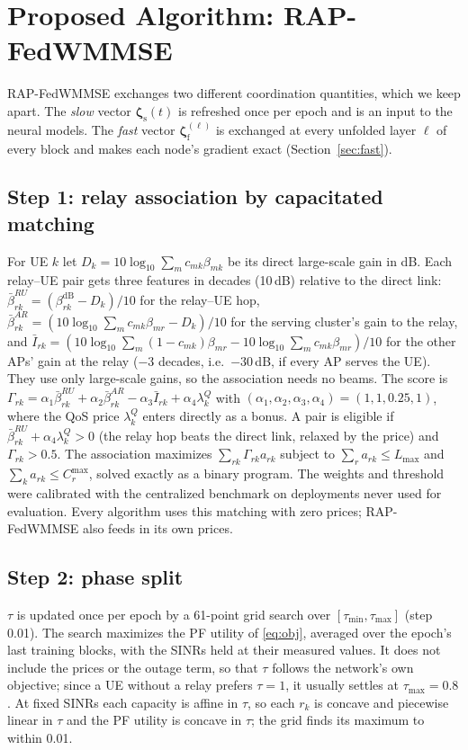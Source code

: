 \documentclass[conference]{IEEEtran}
\newcommand{\zs}{\boldsymbol{\zeta}_{\mathrm{s}}}
\newcommand{\zf}{\boldsymbol{\zeta}_{\mathrm{f}}}
\begin{document}
\section{Proposed Algorithm: RAP-FedWMMSE}
RAP-FedWMMSE exchanges two different coordination quantities, which we keep
apart. The \emph{slow} vector $\zs(t)$ is refreshed once per epoch and is an
input to the neural models. The \emph{fast} vector $\zf^{(\ell)}$ is
exchanged at every unfolded layer $\ell$ of every block and makes each node's
gradient exact (Section~\ref{sec:fast}).

\subsection{Step 1: relay association by capacitated matching}
For UE $k$ let $D_k = 10\log_{10}\sum_m c_{mk}\beta_{mk}$ be its direct
large-scale gain in dB. Each relay--UE pair gets three features in decades
(10\,dB) relative to the direct link: $\bar\beta^{RU}_{rk} =
(\beta^{\mathrm{dB}}_{rk} - D_k)/10$ for the relay--UE hop,
$\bar\beta^{AR}_{rk} = (10\log_{10}\sum_m c_{mk}\beta_{mr} - D_k)/10$ for the
serving cluster's gain to the relay, and $\bar I_{rk} =
(10\log_{10}\sum_m (1-c_{mk})\beta_{mr} - 10\log_{10}\sum_m
c_{mk}\beta_{mr})/10$ for the other APs' gain at the relay ($-3$ decades,
i.e.\ $-30$\,dB, if every AP serves the UE). They use only large-scale gains, so the association needs no beams.
The score is
$\Gamma_{rk} = \alpha_1\bar\beta^{RU}_{rk} + \alpha_2\bar\beta^{AR}_{rk}
- \alpha_3\bar I_{rk} + \alpha_4\lambda^Q_k$ with
$(\alpha_1,\alpha_2,\alpha_3,\alpha_4) = (1, 1, 0.25, 1)$, where the QoS
price $\lambda^Q_k$ enters directly as a bonus. A pair is eligible if
$\bar\beta^{RU}_{rk} + \alpha_4\lambda^Q_k > 0$ (the relay hop beats the
direct link, relaxed by the price) and $\Gamma_{rk} > 0.5$. The association
maximizes $\sum_{rk}\Gamma_{rk}a_{rk}$ subject to $\sum_r a_{rk}\le L_{\max}$
and $\sum_k a_{rk}\le C_r^{\max}$, solved exactly as a binary program. The
weights and threshold were calibrated with the centralized benchmark on
deployments never used for evaluation. Every algorithm uses this matching
with zero prices; RAP-FedWMMSE also feeds in its own prices.

\subsection{Step 2: phase split}
$\tau$ is updated once per epoch by a 61-point grid search over
$[\tau_{\min},\tau_{\max}]$ (step 0.01). The search maximizes the PF utility
of \eqref{eq:obj}, averaged over the epoch's last training blocks, with the
SINRs held at their measured values. It does not include the prices or the
outage term, so that $\tau$ follows the network's own objective; since a UE
without a relay prefers $\tau=1$, it usually settles at $\tau_{\max}=0.8$. At
fixed SINRs each capacity is affine in $\tau$, so each $r_k$ is concave and
piecewise linear in $\tau$ and the PF utility is concave in $\tau$; the grid
finds its maximum to within 0.01.
\end{document}
